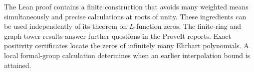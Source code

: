 \documentclass[11pt,letterpaper]{article}
\begin{document}
\thispagestyle{plain}
\par
\vspace{6pt}
\par
\vspace{5pt}
\par
\vspace{10pt}
\noindent The Lean proof contains a finite construction that avoids many weighted means simultaneously and precise calculations at roots of unity. These ingredients can be used independently of its theorem on $L$-function zeros. The finite-ring and graph-tower results answer further questions in the ProveIt reports. Exact positivity certificates locate the zeros of infinitely many Ehrhart polynomials. A local formal-group calculation determines when an earlier interpolation bound is attained.
\end{document}
